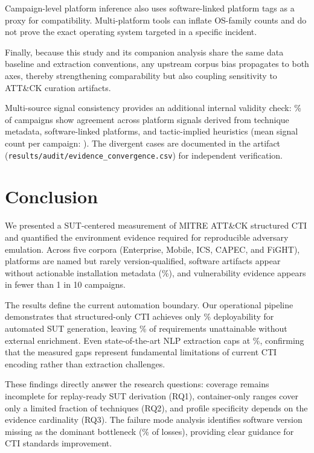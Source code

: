 \documentclass[sigconf,anonymous,review]{acmart}
\newcommand{\mitre}{MITRE\xspace}
\newcommand{\attack}{ATT\&CK\xspace}
\begin{document}
Campaign-level platform inference also uses software-linked platform tags as a proxy for compatibility. Multi-platform tools can inflate OS-family counts and do not prove the exact operating system targeted in a specific incident.

Finally, because this study and its companion analysis share the same data baseline and extraction conventions, any upstream corpus bias propagates to both axes, thereby strengthening comparability but also coupling sensitivity to ATT\&CK curation artifacts.

Multi-source signal consistency provides an additional internal validity check: \evidenceconvergenceratepct\% of campaigns show agreement across platform signals derived from technique metadata, software-linked platforms, and tactic-implied heuristics (mean signal count per campaign: \evidencemeansignalcount{}). The \evidencedivergencecount{} divergent cases are documented in the artifact (\nolinkurl{results/audit/evidence\_convergence.csv}) for independent verification.


\section{Conclusion}\label{sec:conclusion}

We presented a SUT-centered measurement of \mitre{} \attack{} structured CTI and quantified the environment evidence required for reproducible adversary emulation. Across five corpora (Enterprise, Mobile, ICS, CAPEC, and FiGHT), platforms are named but rarely version-qualified, software artifacts appear without actionable installation metadata (\softwarenoversionnocpepercentage\%), and vulnerability evidence appears in fewer than 1 in 10 campaigns.

The results define the current automation boundary. Our operational pipeline demonstrates that structured-only CTI achieves only \pipelinesructuredscore\% deployability for automated SUT generation, leaving \pipelinegappercentage\% of requirements unattainable without external enrichment. Even state-of-the-art NLP extraction caps at \pipelinenlpscore\%, confirming that the measured gaps represent fundamental limitations of current CTI encoding rather than extraction challenges.

These findings directly answer the research questions: coverage remains incomplete for replay-ready SUT derivation (RQ1), container-only ranges cover only a limited fraction of techniques (RQ2), and profile specificity depends on the evidence cardinality (RQ3). The failure mode analysis identifies software version missing as the dominant bottleneck (\failureversionpercentage\% of losses), providing clear guidance for CTI standards improvement.
\end{document}
